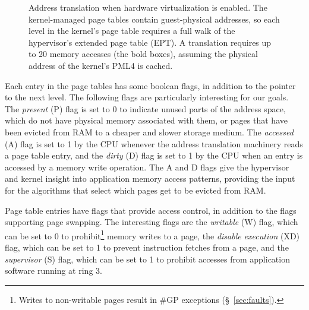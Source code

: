 \begin{figure}[hbtp]
  \caption{
    Address translation when hardware virtualization is enabled. The
    kernel-managed page tables contain guest-physical addresses, so each level
    in the kernel's page table requires a full walk of the hypervisor's
    extended page table (EPT).  A translation requires up to 20 memory accesses
    (the bold boxes), assuming the physical address of the kernel's PML4 is
    cached.
  }
  \label{fig:vmx_paging}
\end{figure}

Each entry in the page tables has some boolean flags, in addition to the
pointer to the next level. The following flags are particularly interesting for
our goals. The \textit{present} (P) flag is set to 0 to indicate unused parts
of the address space, which do not have physical memory associated with them,
or pages that have been evicted from RAM to a cheaper and slower storage
medium.  The \textit{accessed} (A) flag is set to 1 by the CPU whenever the
address translation machinery reads a page table entry, and the \textit{dirty}
(D) flag is set to 1 by the CPU when an entry is accessed by a memory write
operation. The A and D flags give the hypervisor and kernel insight into
application memory access patterns, providing the input for the algorithms that
select which pages get to be evicted from RAM.


Page table entries have flags that provide access control, in addition to the
flags supporting page swapping. The interesting flags are the \textit{writable}
(W) flag, which can be set to 0 to prohibit\footnote{Writes to non-writable
pages result in \#GP exceptions (\S~\ref{sec:faults}).} memory writes to a
page, the \textit{disable execution} (XD) flag, which can be set to 1 to
prevent instruction fetches from a page, and the \textit{supervisor} (S) flag,
which can be set to 1 to prohibit accesses from application software running at
ring 3.
